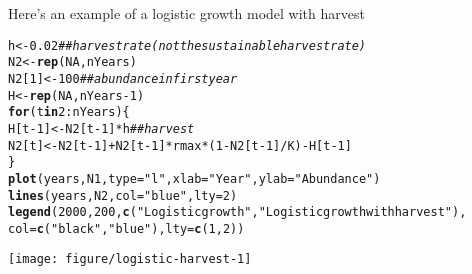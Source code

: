 \documentclass[12pt]{article}\usepackage[]{graphicx}\usepackage[]{xcolor}
\makeatletter
\newcommand{\hlnum}[1]{\textcolor[rgb]{0.686,0.059,0.569}{#1}}%
\newcommand{\hlsng}[1]{\textcolor[rgb]{0.192,0.494,0.8}{#1}}%
\newcommand{\hlcom}[1]{\textcolor[rgb]{0.678,0.584,0.686}{\textit{#1}}}%
\newcommand{\hlopt}[1]{\textcolor[rgb]{0,0,0}{#1}}%
\newcommand{\hldef}[1]{\textcolor[rgb]{0.345,0.345,0.345}{#1}}%
\newcommand{\hlkwa}[1]{\textcolor[rgb]{0.161,0.373,0.58}{\textbf{#1}}}%
\newcommand{\hlkwb}[1]{\textcolor[rgb]{0.69,0.353,0.396}{#1}}%
\newcommand{\hlkwc}[1]{\textcolor[rgb]{0.333,0.667,0.333}{#1}}%
\newcommand{\hlkwd}[1]{\textcolor[rgb]{0.737,0.353,0.396}{\textbf{#1}}}%
\newenvironment{kframe}{%
 \def\at@end@of@kframe{}%
 \ifinner\ifhmode%
  \def\at@end@of@kframe{\end{minipage}}%
  \begin{minipage}{\columnwidth}%
 \fi\fi%
 \def\FrameCommand##1{\hskip\@totalleftmargin \hskip-\fboxsep
 \colorbox{shadecolor}{##1}\hskip-\fboxsep
     \hskip-\linewidth \hskip-\@totalleftmargin \hskip\columnwidth}%
 \MakeFramed {\advance\hsize-\width
   \@totalleftmargin\z@ \linewidth\hsize
   \@setminipage}}%
 {\par\unskip\endMakeFramed%
 \at@end@of@kframe}
\newenvironment{knitrout}{}{} %
\makeatother
\begin{document}
Here's an example of a logistic growth model with harvest
\begin{knitrout}\small
{}\color{fgcolor}\begin{kframe}
\begin{alltt}
\hldef{h} \hlkwb{<-} \hlnum{0.02}                \hlcom{## harvest rate (not the sustainable harvest rate)}
\hldef{N2} \hlkwb{<-} \hlkwd{rep}\hldef{(}\hlnum{NA}\hldef{, nYears)}
\hldef{N2[}\hlnum{1}\hldef{]} \hlkwb{<-} \hlnum{100}             \hlcom{## abundance in first year}
\hldef{H} \hlkwb{<-} \hlkwd{rep}\hldef{(}\hlnum{NA}\hldef{, nYears}\hlopt{-}\hlnum{1}\hldef{)}
\hlkwa{for}\hldef{(t} \hlkwa{in} \hlnum{2}\hlopt{:}\hldef{nYears) \{}
    \hldef{H[t}\hlopt{-}\hlnum{1}\hldef{]} \hlkwb{<-} \hldef{N2[t}\hlopt{-}\hlnum{1}\hldef{]}\hlopt{*}\hldef{h}  \hlcom{## harvest}
    \hldef{N2[t]} \hlkwb{<-} \hldef{N2[t}\hlopt{-}\hlnum{1}\hldef{]} \hlopt{+} \hldef{N2[t}\hlopt{-}\hlnum{1}\hldef{]}\hlopt{*}\hldef{rmax}\hlopt{*}\hldef{(}\hlnum{1} \hlopt{-} \hldef{N2[t}\hlopt{-}\hlnum{1}\hldef{]}\hlopt{/}\hldef{K)} \hlopt{-} \hldef{H[t}\hlopt{-}\hlnum{1}\hldef{]}
\hldef{\}}
\hlkwd{plot}\hldef{(years, N1,} \hlkwc{type}\hldef{=}\hlsng{"l"}\hldef{,} \hlkwc{xlab}\hldef{=}\hlsng{"Year"}\hldef{,} \hlkwc{ylab}\hldef{=}\hlsng{"Abundance"}\hldef{)}
\hlkwd{lines}\hldef{(years, N2,} \hlkwc{col}\hldef{=}\hlsng{"blue"}\hldef{,} \hlkwc{lty}\hldef{=}\hlnum{2}\hldef{)}
\hlkwd{legend}\hldef{(}\hlnum{2000}\hldef{,} \hlnum{200}\hldef{,} \hlkwd{c}\hldef{(}\hlsng{"Logistic growth"}\hldef{,} \hlsng{"Logistic growth with harvest"}\hldef{),}
       \hlkwc{col}\hldef{=}\hlkwd{c}\hldef{(}\hlsng{"black"}\hldef{,} \hlsng{"blue"}\hldef{),} \hlkwc{lty}\hldef{=}\hlkwd{c}\hldef{(}\hlnum{1}\hldef{,}\hlnum{2}\hldef{))}
\end{alltt}
\end{kframe}

{\centering \texttt{[image: figure/logistic-harvest-1]} 

}


\end{knitrout}
\end{document}
